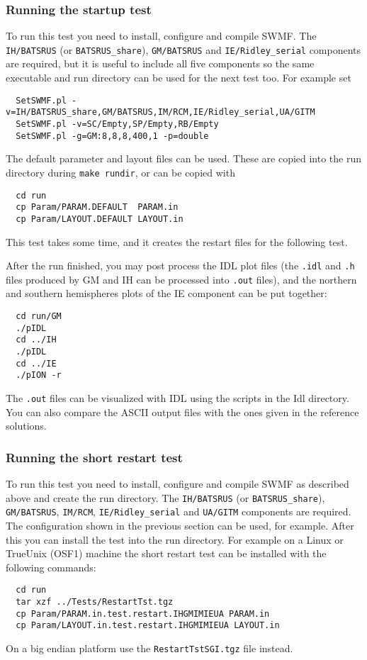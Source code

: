 \subsubsection{Running the startup test}

To run this test you need to install, configure and compile SWMF.
The {\tt IH/BATSRUS} (or {\tt BATSRUS\_share}), 
{\tt GM/BATSRUS} and {\tt IE/Ridley\_serial}
components are required, but it is useful to include all five
components so the same executable and run directory 
can be used for the next test too. For example set
\begin{verbatim}
  SetSWMF.pl -v=IH/BATSRUS_share,GM/BATSRUS,IM/RCM,IE/Ridley_serial,UA/GITM
  SetSWMF.pl -v=SC/Empty,SP/Empty,RB/Empty
  SetSWMF.pl -g=GM:8,8,8,400,1 -p=double
\end{verbatim}
The default parameter and layout files can be used. 
These are copied into the run directory during {\tt make rundir},
or can be copied with
\begin{verbatim}
  cd run
  cp Param/PARAM.DEFAULT  PARAM.in
  cp Param/LAYOUT.DEFAULT LAYOUT.in
\end{verbatim}
This test takes some time, and it creates the restart files
for the following test. 

After the run finished, you may post process the IDL plot files (the
{\tt .idl} and {\tt .h} files produced by GM and IH can be processed
into {\tt .out} files), and the northern and southern hemispheres
plots of the IE component can be put together: 
\begin{verbatim}
  cd run/GM
  ./pIDL
  cd ../IH
  ./pIDL
  cd ../IE
  ./pION -r
\end{verbatim}
The {\tt .out} files can be visualized with IDL using the scripts in
the Idl directory.  You can also compare the ASCII output files with
the ones given in the reference solutions.

\subsubsection{Running the short restart test}

To run this test you need to install, configure and compile SWMF
as described above and create the run directory. 
The {\tt IH/BATSRUS} (or {\tt BATSRUS\_share}),
{\tt GM/BATSRUS}, {\tt IM/RCM}, {\tt IE/Ridley\_serial} and
{\tt UA/GITM} components are required. The configuration shown
in the previous section can be used, for example.
After this you can install the test into the run directory.  
For example on a Linux or TrueUnix
(OSF1) machine the short restart test can be installed with the
following commands:
\begin{verbatim}
  cd run
  tar xzf ../Tests/RestartTst.tgz
  cp Param/PARAM.in.test.restart.IHGMIMIEUA PARAM.in
  cp Param/LAYOUT.in.test.restart.IHGMIMIEUA LAYOUT.in
\end{verbatim}
On a big endian platform use the {\tt RestartTstSGI.tgz} file instead.

